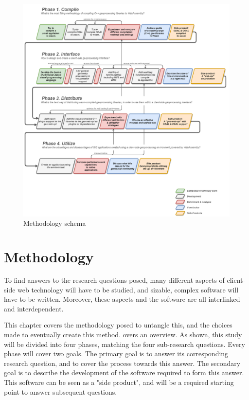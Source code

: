
\begin{figure}
    \centering
    \graphicspath{ {../schemas/methodology/} }
    \includegraphics[width=14cm]{method.png}
    \caption{Methodology schema}
    \label{fig:method}
\end{figure}

\section{Methodology}

To find answers to the research questions posed, many different aspects of client-side web technology will have to be studied, and sizable, complex software will have to be written. Moreover, these aspects and the software are all interlinked and interdependent.

This chapter covers the methodology posed to untangle this, and the choices made to eventually create this method.  overs an overview. As shown, this study will be divided into four phases, matching the four sub-research questions. Every phase will cover two goals. The primary goal is to answer its corresponding research question, and to cover the process towards this answer. The secondary goal is to describe the development of the software required to form this answer. This software can be seen as a "side product", and will be a required starting point to answer subsequent questions. 

